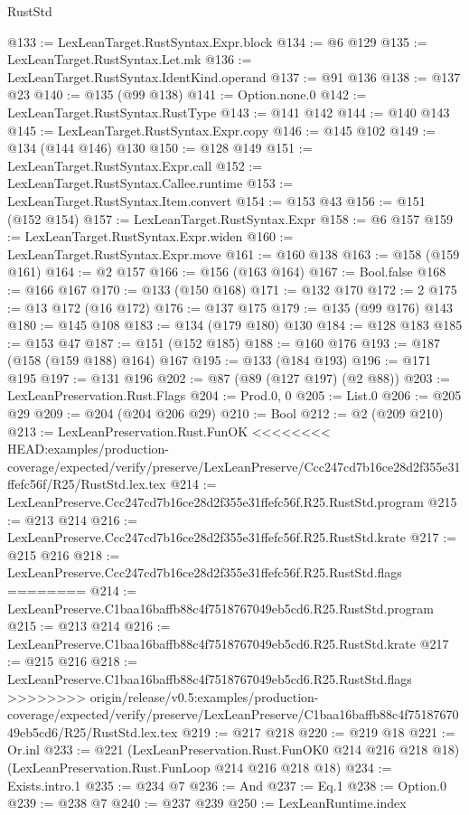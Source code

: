 \begin{lexlean}{RustStd}
\begin{coremodule}
{\begin{coremodule}
{{{{{@133 := LexLeanTarget.RustSyntax.Expr.block
@134 := @6 @129
@135 := LexLeanTarget.RustSyntax.Let.mk
@136 := LexLeanTarget.RustSyntax.IdentKind.operand
@137 := @91 @136
@138 := @137 @23
@140 := @135 (@99 @138)
@141 := Option.none.{0}
@142 := LexLeanTarget.RustSyntax.RustType
@143 := @141 @142
@144 := @140 @143
@145 := LexLeanTarget.RustSyntax.Expr.copy
@146 := @145 @102
@149 := @134 (@144 @146) @130
@150 := @128 @149
@151 := LexLeanTarget.RustSyntax.Expr.call
@152 := LexLeanTarget.RustSyntax.Callee.runtime
@153 := LexLeanTarget.RustSyntax.Item.convert
@154 := @153 @43
@156 := @151 (@152 @154)
@157 := LexLeanTarget.RustSyntax.Expr
@158 := @6 @157
@159 := LexLeanTarget.RustSyntax.Expr.widen
@160 := LexLeanTarget.RustSyntax.Expr.move
@161 := @160 @138
@163 := @158 (@159 @161)
@164 := @2 @157
@166 := @156 (@163 @164)
@167 := Bool.false
@168 := @166 @167
@170 := @133 (@150 @168)
@171 := @132 @170
@172 := 2
@175 := @13 @172 (@16 @172)
@176 := @137 @175
@179 := @135 (@99 @176) @143
@180 := @145 @108
@183 := @134 (@179 @180) @130
@184 := @128 @183
@185 := @153 @47
@187 := @151 (@152 @185)
@188 := @160 @176
@193 := @187 (@158 (@159 @188) @164) @167
@195 := @133 (@184 @193)
@196 := @171 @195
@197 := @131 @196
@202 := @87 (@89 (@127 @197) (@2 @88))
@203 := LexLeanPreservation.Rust.Flags
@204 := Prod.{0, 0}
@205 := List.{0}
@206 := @205 @29
@209 := @204 (@204 @206 @29)
@210 := Bool
@212 := @2 (@209 @210)
@213 := LexLeanPreservation.Rust.FunOK
<<<<<<<< HEAD:examples/production-coverage/expected/verify/preserve/LexLeanPreserve/Ccc247cd7b16ce28d2f355e31ffefc56f/R25/RustStd.lex.tex
@214 := LexLeanPreserve.Ccc247cd7b16ce28d2f355e31ffefc56f.R25.RustStd.program
@215 := @213 @214
@216 := LexLeanPreserve.Ccc247cd7b16ce28d2f355e31ffefc56f.R25.RustStd.krate
@217 := @215 @216
@218 := LexLeanPreserve.Ccc247cd7b16ce28d2f355e31ffefc56f.R25.RustStd.flags
========
@214 := LexLeanPreserve.C1baa16baffb88c4f7518767049eb5cd6.R25.RustStd.program
@215 := @213 @214
@216 := LexLeanPreserve.C1baa16baffb88c4f7518767049eb5cd6.R25.RustStd.krate
@217 := @215 @216
@218 := LexLeanPreserve.C1baa16baffb88c4f7518767049eb5cd6.R25.RustStd.flags
>>>>>>>> origin/release/v0.5:examples/production-coverage/expected/verify/preserve/LexLeanPreserve/C1baa16baffb88c4f7518767049eb5cd6/R25/RustStd.lex.tex
@219 := @217 @218
@220 := @219 @18
@221 := Or.inl
@233 := @221
    (LexLeanPreservation.Rust.FunOK0 @214 @216 @218 @18)
    (LexLeanPreservation.Rust.FunLoop @214 @216 @218 @18)
@234 := Exists.intro.{1}
@235 := @234 @7
@236 := And
@237 := Eq.{1}
@238 := Option.{0}
@239 := @238 @7
@240 := @237 @239
@250 := LexLeanRuntime.index
}}}}}
\end{coremodule}}
\end{coremodule}
\end{lexlean}
